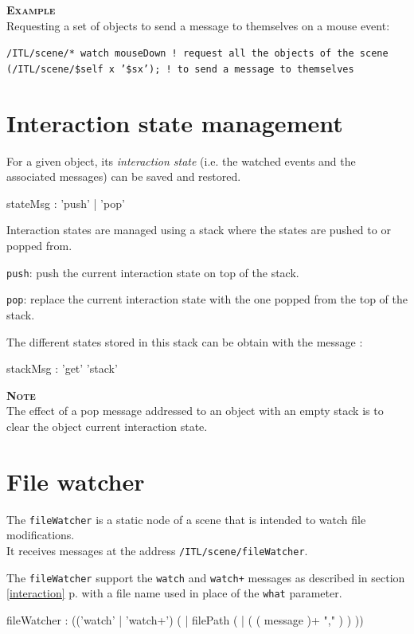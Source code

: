 \documentclass[a4paper,twoside]{report}
\newcommand{\sublevel}[1]	{\section{#1}}
\newcommand{\fullref}[1]	{\ref{#1} p.\pageref{#1}}
\newcommand{\OSC}[1]		{\texttt{#1}}
\newcommand{\example}		{\textbf{\hspace{-1.5cm}\textbf{\textsc{Example }}}}
\newcommand{\note}	[1]		{\vspace{2mm}\textbf{\hspace{-1.03cm}\textbf{\textsc{Note #1}}}}
\let\olditemize\itemize
\let\oldenditemize\enditemize
\renewenvironment{itemize} 	{\olditemize \setlength{\itemsep}{1mm}}{\oldenditemize}
\newcommand{\sample}	[1]			{\vspace{-2mm}\begin{center}\colorbox{mygrey}{
								\begin{minipage}[t]{0.9\columnwidth} 
								{\small \texttt{#1}}
								\end{minipage}}\end{center}}
\begin{document}
\example \\
Requesting a set of objects to send a message to themselves on a mouse event:
\sample{/ITL/scene/* watch mouseDown \hspace*{2.4cm}! request all the objects of the scene \\
\hspace*{2.7cm}(/ITL/scene/\$self x '\$sx'); ! to send a message to themselves
}

\sublevel{Interaction state management}
\label{evtstate}

For a given object, its \emph{interaction state} (i.e. the watched events and the associated messages) can be saved and restored.
\begin{rail} 
stateMsg : 'push' | 'pop'
\end{rail}

Interaction states are managed using a stack where the states are pushed to or popped from.
\begin{itemize}
\item \OSC{push}: push the current interaction state on top of the stack.
\item \OSC{pop}: replace the current interaction state with the one popped from the top of the stack.
\end{itemize}

The different states stored in this stack can be obtain with the message :

\begin{rail} 
stackMsg : 'get' 'stack'
\end{rail}

\note{} \\
The effect of a pop message addressed to an object with an empty stack is to clear the object current interaction state.


\sublevel{File watcher}
\label{filewatch}

The \OSC{fileWatcher} is a static node of a scene that is intended to watch file modifications. \\
It receives messages at the address \OSC{/ITL/scene/fileWatcher}.

The \OSC{fileWatcher} support the \OSC{watch} and \OSC{watch+} messages as described in section \fullref{interaction} with a file name used in place of the \OSC{what} parameter.

\begin{rail}
fileWatcher : (('watch' | 'watch+')  ( | filePath  ( |  ( ( message  )+ "," ) )  )) 
\end{rail}
\end{document}
